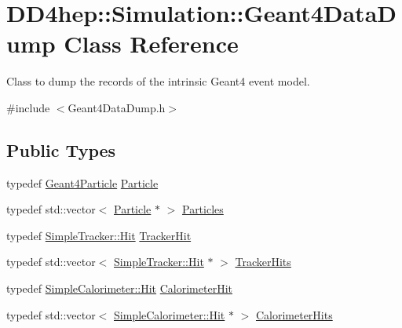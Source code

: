 \hypertarget{class_d_d4hep_1_1_simulation_1_1_geant4_data_dump}{}\section{D\+D4hep\+:\+:Simulation\+:\+:Geant4\+Data\+Dump Class Reference}
\label{class_d_d4hep_1_1_simulation_1_1_geant4_data_dump}


Class to dump the records of the intrinsic Geant4 event model.  




{\ttfamily \#include $<$Geant4\+Data\+Dump.\+h$>$}

\subsection*{Public Types}
\begin{DoxyCompactItemize}
\item 
typedef \hyperlink{class_d_d4hep_1_1_simulation_1_1_geant4_particle}{Geant4\+Particle} \hyperlink{class_d_d4hep_1_1_simulation_1_1_geant4_data_dump_a94c26fac6b79beaaed2c75c680b3f374}{Particle}
\item 
typedef std\+::vector$<$ \hyperlink{class_d_d4hep_1_1_simulation_1_1_geant4_data_dump_a94c26fac6b79beaaed2c75c680b3f374}{Particle} $\ast$ $>$ \hyperlink{class_d_d4hep_1_1_simulation_1_1_geant4_data_dump_a78b5910af0db1442a14600ae8dfc2a92}{Particles}
\item 
typedef \hyperlink{class_d_d4hep_1_1_simulation_1_1_geant4_tracker_1_1_hit}{Simple\+Tracker\+::\+Hit} \hyperlink{class_d_d4hep_1_1_simulation_1_1_geant4_data_dump_aaeea8b5b317a9a22e13f472200917ad2}{Tracker\+Hit}
\item 
typedef std\+::vector$<$ \hyperlink{class_d_d4hep_1_1_simulation_1_1_geant4_tracker_1_1_hit}{Simple\+Tracker\+::\+Hit} $\ast$ $>$ \hyperlink{class_d_d4hep_1_1_simulation_1_1_geant4_data_dump_aa71f3341672792aa15c10e82cdbeca4b}{Tracker\+Hits}
\item 
typedef \hyperlink{class_d_d4hep_1_1_simulation_1_1_geant4_calorimeter_1_1_hit}{Simple\+Calorimeter\+::\+Hit} \hyperlink{class_d_d4hep_1_1_simulation_1_1_geant4_data_dump_abbb746f00c083cdb09c3e0331cb920be}{Calorimeter\+Hit}
\item 
typedef std\+::vector$<$ \hyperlink{class_d_d4hep_1_1_simulation_1_1_geant4_calorimeter_1_1_hit}{Simple\+Calorimeter\+::\+Hit} $\ast$ $>$ \hyperlink{class_d_d4hep_1_1_simulation_1_1_geant4_data_dump_a405c85a9a72c4f1dc0164d4a61d98f75}{Calorimeter\+Hits}
\end{DoxyCompactItemize}
